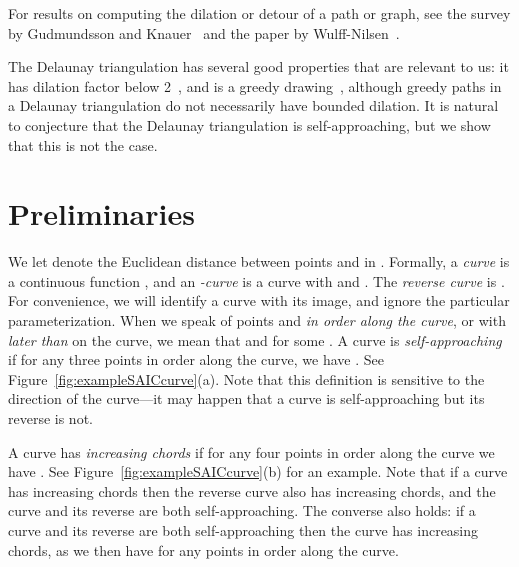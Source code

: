 \documentclass[11pt]{article}
\newcommand{\changed}[1]{#1}
\begin{document}
For results on computing the dilation or detour of a path or graph, see the survey by
 Gudmundsson and Knauer~\cite{Gudmundsson:Dilation:2007} and the paper by Wulff-Nilsen~\cite{Wulff-Nilsen:Detour:2010}.

The Delaunay triangulation has several good properties that are relevant to us: it has dilation factor below 2~\cite{Xia:Delaunay:2011}, and is a greedy drawing~\cite{Bose:routing:2004}, although greedy paths in a Delaunay triangulation do not necessarily have bounded dilation.
It is natural to conjecture that the Delaunay triangulation is self-approaching, but we show that this is not the case.





\section{Preliminaries}
We let  denote the Euclidean distance between points  and  in .
{\changed Formally, a
\emph{curve} is a continuous function , and an \emph{-curve} is a curve  with  and .
The \emph{reverse curve} is .
For convenience, we will identify a curve with its image, and ignore the particular parameterization.  When we speak of points  and  \emph{in order along the curve}, or with  \emph{later than}  on the curve, we mean that  and  for some .
A curve is \emph{self-approaching} if for any three points  in order along the curve, we have . See Figure~\ref{fig:exampleSAICcurve}(a).
Note that this definition is sensitive to the direction of the curve---it may happen that a curve is self-approaching but its reverse is not.}

{\changed A curve has \emph{increasing chords} if for any four points  in order along the curve we have . See Figure~\ref{fig:exampleSAICcurve}(b) for an example.
Note that if a curve has increasing chords then the reverse curve also has increasing chords, and the curve and its reverse are both self-approaching.
The converse also holds: if a curve and its reverse are both self-approaching then the  curve has increasing chords, as we then have  for any points  in order along the curve.}
\end{document}
